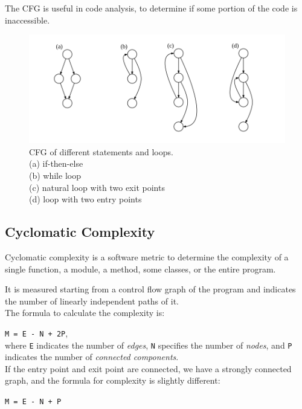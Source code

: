 The CFG is useful in code analysis, to determine if some portion of the code is inaccessible.

\begin{figure}[!h]
	\centering
	\includegraphics[width=1.0\columnwidth]{cfg.png}
	\caption{CFG of different statements and loops. \\
	(a) if-then-else\\
	(b) while loop\\
	(c) natural loop with two exit points\\
	(d) loop with two entry points	
}
	\label{fig:cfg}
\end{figure}

\subsection{Cyclomatic Complexity}
Cyclomatic complexity is a software metric to determine the complexity of a single function, a module, a method, some classes, or the entire program.

It is measured starting from a control flow graph of the program and indicates the number of linearly independent paths of it. 
\\
The formula to calculate the complexity is:

\texttt{M =  E - N + 2P},\\
where \texttt{E} indicates the number of \textit{edges}, \texttt{N} specifies the number of \textit{nodes}, and \texttt{P} indicates the number of \textit{connected components}.\\

If the entry point and exit point are connected, we have a strongly connected graph, and the formula for complexity is slightly different: 

\texttt{M = E - N + P}

